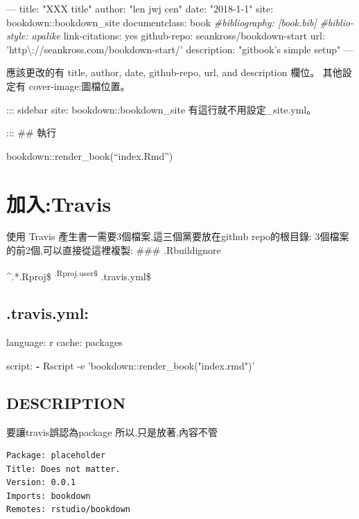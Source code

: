 \documentclass[]{book}
\newenvironment{Shaded}{\begin{snugshade}}{\end{snugshade}}
\newcommand{\KeywordTok}[1]{\textcolor[rgb]{0.13,0.29,0.53}{\textbf{#1}}}
\newcommand{\StringTok}[1]{\textcolor[rgb]{0.31,0.60,0.02}{#1}}
\newcommand{\CommentTok}[1]{\textcolor[rgb]{0.56,0.35,0.01}{\textit{#1}}}
\newcommand{\OtherTok}[1]{\textcolor[rgb]{0.56,0.35,0.01}{#1}}
\newcommand{\FunctionTok}[1]{\textcolor[rgb]{0.00,0.00,0.00}{#1}}
\newcommand{\AttributeTok}[1]{\textcolor[rgb]{0.77,0.63,0.00}{#1}}
\theoremstyle{definition}
\theoremstyle{definition}
\theoremstyle{definition}
\theoremstyle{remark}
\begin{document}
\begin{Shaded}
\begin{Highlighting}[]
\OtherTok{---}
\FunctionTok{title:}\AttributeTok{ }\StringTok{"XXX title"}
\FunctionTok{author:}\AttributeTok{ }\StringTok{"len jwj cen"}
\FunctionTok{date:}\AttributeTok{ }\StringTok{"2018-1-1"}
\FunctionTok{site:}\AttributeTok{ bookdown::bookdown_site}
\FunctionTok{documentclass:}\AttributeTok{ book}
\CommentTok{#bibliography: [book.bib]}
\CommentTok{#biblio-style: apalike}
\FunctionTok{link-citations:}\AttributeTok{ yes}
\FunctionTok{github-repo:}\AttributeTok{ seankross/bookdown-start}
\FunctionTok{url:}\AttributeTok{ }\StringTok{'http\textbackslash{}://seankross.com/bookdown-start/'}
\FunctionTok{description:}\AttributeTok{ }\StringTok{"gitbook's simple setup"}
\OtherTok{---}
\end{Highlighting}
\end{Shaded}

應該更改的有 title, author, date, github-repo, url, and description
欄位。 其他設定有 cover-image:圖檔位置。

::: sidebar site: bookdown::bookdown\_site 有這行就不用設定\_site.yml。

::: \#\# 執行

bookdown::render\_book(``index.Rmd'')

\section{加入:Travis}\label{travis}

使用 Travis 產生書一需要3個檔案,這三個黨要放在github repo的根目錄:
3個檔案的前2個,可以直接從這裡複製: \#\#\# .Rbuildignore

\^{}.*.Rproj\$ \textsuperscript{.Rproj.user\$ }.travis.yml\$

\subsection{.travis.yml:}\label{travis.yml-1}

\begin{Shaded}
\begin{Highlighting}[]
\FunctionTok{language:}\AttributeTok{ r}
\FunctionTok{cache:}\AttributeTok{ packages}

\FunctionTok{script:}
  \KeywordTok{-} \FunctionTok{Rscript -e 'bookdown:}\AttributeTok{:render_book("index.rmd")'}
\end{Highlighting}
\end{Shaded}

\subsection{DESCRIPTION}\label{description}

要讓travis誤認為package 所以,只是放著,內容不管

\begin{verbatim}
Package: placeholder
Title: Does not matter.
Version: 0.0.1
Imports: bookdown
Remotes: rstudio/bookdown
\end{verbatim}
\end{document}

